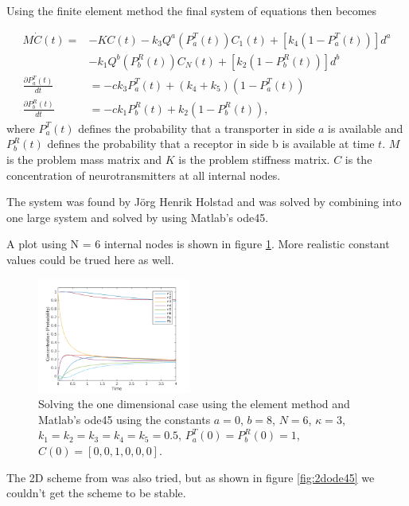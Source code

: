 Using the finite element method the final system of equations then becomes

\begin{align*}
M \dot{C}(t) =  &-KC(t) - k_3Q^a(P_a^T(t))C_1(t) + \left[k_4(1-P_a^T(t))\right]d^a \\
& - k_1Q^b(P_b^R(t))C_N(t) + \left[k_2(1-P_b^R(t))\right]d^b \\
\frac{\partial P_a^T(t)}{dt} &= -ck_3 P_a^T(t) + (k_4 + k_5)(1-P_a^T(t))\\
\frac{\partial P_b^R(t)}{dt} &= -ck_1 P_b^R(t) + k_2(1-P_b^R(t)),
\end{align*}
where $P_a^T(t)$ defines the probability that a transporter in side $a$ is available and $P_b^R(t)$ defines the probability that a receptor in side b is available at time $t$. $M$ is the problem mass matrix and $K$ is the problem stiffness matrix. $C$ is the concentration of neurotransmitters at all internal nodes.

The system was found by Jörg Henrik Holstad \cite{holstad} and was solved by combining into one large system and solved by using Matlab's ode45.

A plot using N = 6 internal nodes is shown in figure \ref{fig:1dode}. More realistic constant values could be trued here as well. 

\begin{figure}[ht]
  \centering
    \includegraphics[width=0.45\textwidth]{1dodeLabels}
      \caption{Solving the one dimensional case using the element method and Matlab's ode45 using the constants $a = 0$, $b = 8$, $N = 6$, $\kappa = 3$, $k_1=k_2=k_3=k_4=k_5 = 0.5$, $P_a^T(0) = P_b^R(0) = 1$, $C(0) = [0, 0, 1, 0, 0, 0]$.}
      \label{fig:1dode}
\end{figure}

The 2D scheme from \cite{holstad} was also tried, but as shown in figure \ref{fig:2dode45} we couldn't get the scheme to be stable.

